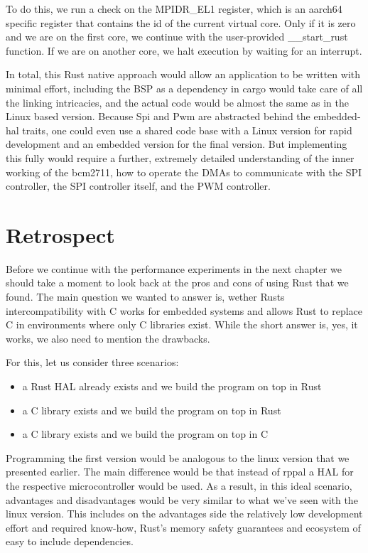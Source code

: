 To do this, we run a check on the MPIDR\_EL1 register, which is an aarch64 specific register that contains the id of the current virtual core.
Only if it is zero and we are on the first core, we continue with the user-provided \_\_start\_rust function.
If we are on another core, we halt execution by waiting for an interrupt.



In total, this Rust native approach would allow an application to be written with minimal effort,
including the BSP as a dependency in cargo would take care of all the linking intricacies,
and the actual code would be almost the same as in the Linux based version.
Because Spi and Pwm are abstracted behind the embedded-hal traits, one could even use a shared code base with a Linux version for rapid development
and an embedded version for the final version.
But implementing this fully would require a further, extremely detailed understanding of the inner working of the bcm2711,
how to operate the DMAs to communicate with the SPI controller, the SPI controller itself, and the PWM controller.

\section{Retrospect}

Before we continue with the performance experiments in the next chapter we should take a moment to look back at the pros and cons of using Rust that we found.
The main question we wanted to answer is, wether Rusts intercompatibility with C works for embedded systems and allows Rust to replace C in environments where only C libraries exist.
While the short answer is, yes, it works, we also need to mention the drawbacks.

For this, let us consider three scenarios:
\begin{itemize}
    \item a Rust HAL already exists and we build the program on top in Rust
    \item a C library exists and we build the program on top in Rust
    \item a C library exists and we build the program on top in C
\end{itemize}

Programming the first version would be analogous to the linux version that we presented earlier.
The main difference would be that instead of rppal a HAL for the respective microcontroller would be used.
As a result, in this ideal scenario, advantages and disadvantages would be very similar to what we've seen with the linux version.
This includes on the advantages side the relatively low development effort and required know-how, Rust's memory safety guarantees and ecosystem of easy to include dependencies.


